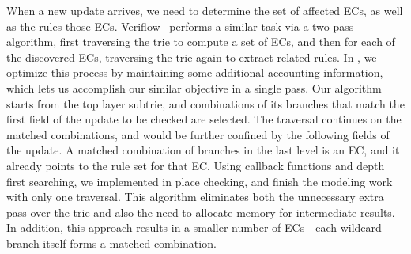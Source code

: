 When a new update arrives, we need to determine the set of affected ECs, as well as the rules   those ECs.
Veriflow~\cite{VeriFlow} performs a similar task via a two-pass algorithm,
first traversing the trie to compute a set of ECs, and then for each of the
discovered ECs, traversing the trie again to extract related rules.  In \name,
we optimize this process by maintaining some additional accounting information,
which lets us accomplish our similar objective in a single pass.  
Our algorithm starts from the top layer subtrie, and combinations
of its branches that match the first field of the update to be checked are
selected.  The traversal continues on the matched combinations, and would be
further confined by the following fields of the update.  A matched combination
of branches in the last level is an EC, and it already points to the rule set
for that EC.  Using callback functions and depth first searching, we
implemented in place checking, and finish the modeling work with only one
traversal.  This algorithm eliminates both the unnecessary extra pass over the
trie and also the need to allocate memory for intermediate results.  In
addition, this approach results in a smaller number of ECs---each wildcard
branch itself forms a matched combination.


